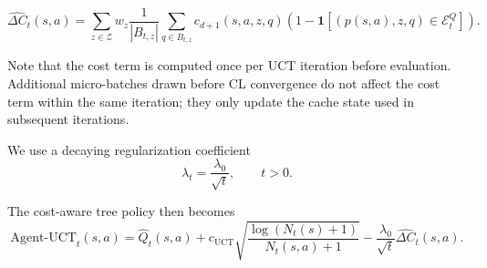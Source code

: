 \documentclass{article}
\begin{document}
\[
\widehat{\Delta C}_t(s,a)
=
\sum_{z\in \mathcal Z}
w_z
\frac{1}{|B_{t,z}|}
\sum_{q\in B_{t,z}}
c_{d+1}(s,a,z,q)
\left(
1 -
\mathbf{1}
\left[
(p(s,a),z,q)\in\mathcal E_t^Q
\right]
\right).
\]





Note that the cost term is computed once per UCT iteration before evaluation. 
Additional micro-batches drawn before CL convergence do not affect the cost term within the same iteration; they only update the cache state used in subsequent iterations.

We use a decaying regularization coefficient
\[
\lambda_t = \frac{\lambda_0}{\sqrt{t}}, \qquad t>0.
\]

The cost-aware tree policy then becomes
\[
\mathrm{Agent\text{-}UCT}_t(s,a)
=
\hat Q_t(s,a)
+
c_{\mathrm{UCT}}
\sqrt{
\frac{\log(N_t(s)+1)}{N_t(s,a)+1}
}
-
\frac{\lambda_0}{\sqrt{t}}
\widehat{\Delta C}_t(s,a).
\]
\end{document}
